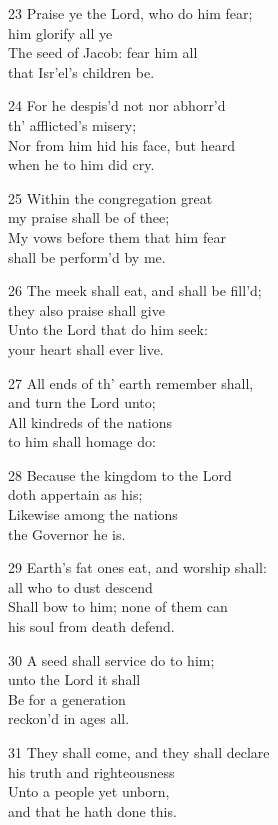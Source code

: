 \begin{multicols}{3}
23 Praise ye the Lord, who do him fear;\\
him glorify all ye\\
The seed of Jacob: fear him all\\
that Isr’el’s children be.

24 For he despis’d not nor abhorr’d\\
th’ afflicted’s misery;\\
Nor from him hid his face, but heard\\
when he to him did cry.

25 Within the congregation great\\
my praise shall be of thee;\\
My vows before them that him fear\\
shall be perform’d by me.

26 The meek shall eat, and shall be fill’d;\\
they also praise shall give\\
Unto the Lord that do him seek:\\
your heart shall ever live.

27 All ends of th’ earth remember shall,\\
and turn the Lord unto;\\
All kindreds of the nations\\
to him shall homage do:

28 Because the kingdom to the Lord\\
doth appertain as his;\\
Likewise among the nations\\
the Governor he is.

29 Earth’s fat ones eat, and worship shall:\\
all who to dust descend\\
Shall bow to him; none of them can\\
his soul from death defend.

30 A seed shall service do to him;\\
unto the Lord it shall\\
Be for a generation\\
reckon’d in ages all.

31 They shall come, and they shall declare\\
his truth and righteousness\\
Unto a people yet unborn,\\
and that he hath done this.

\begin{center}
\quad{}\quad{}
\end{center}


\end{multicols}
